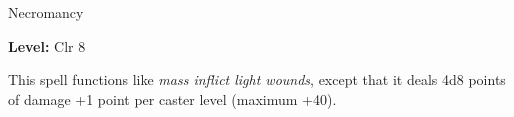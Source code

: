 \label{spell:Mass Inflict Critical Wounds}

Necromancy

\textbf{Level:} Clr 8

This spell functions like \textit{mass inflict light wounds}, except that it deals 
4d8 points of damage +1 point per caster level (maximum +40).

